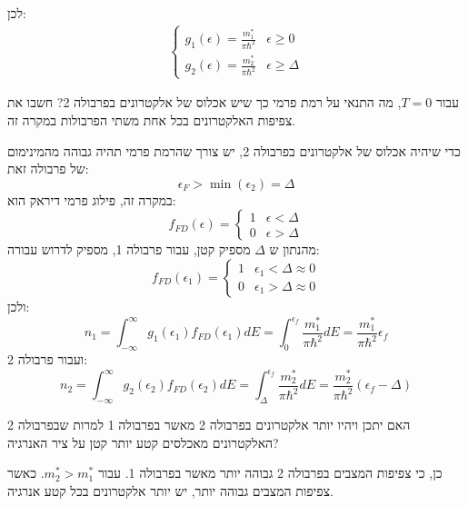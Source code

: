 \documentclass{article}
\begin{document}
\begin{Question}
\begin{SubAnswer}
    לכן:
    \begin{align*}
        \begin{cases}
            g_{1}\left( \epsilon \right)=\frac{m_{1}^{*}}{\pi \hbar^{2}}& \epsilon\geq0 \\
            g_{2}\left( \epsilon \right)=\frac{m_{2}^{*}}{\pi \hbar^{2}}     & \epsilon\geq\Delta 
        \end{cases}
    \end{align*}
\end{SubAnswer}
\begin{SubQuestion}
עבור $T=0$, מה התנאי על רמת פרמי כך שיש אכלוס של אלקטרונים בפרבולה 2? חשבו את צפיפות האלקטרונים בכל אחת משתי הפרבולות במקרה זה.
\end{SubQuestion}
\begin{SubAnswer}
כדי שיהיה אכלוס של אלקטרונים בפרבולה 2, יש צורך שהרמת פרמי תהיה גבוהה מהמינימום של פרבולה זאת:
$$\epsilon_{F}>\min{\left( \epsilon_{2} \right)}=\Delta$$
במקרה זה, פילוג פרמי דיראק הוא:
$$f_{FD}\left( \epsilon \right)=\begin{cases}
    1 & \epsilon<\Delta\\
    0 & \epsilon>\Delta
\end{cases}$$
מהנתון ש $\Delta$ מספיק קטן, עבור פרבולה 1, מספיק לדרוש עבורה:
$$f_{FD}\left( \epsilon_{1} \right)=\begin{cases}
    1 & \epsilon_{1}<\Delta\approx0\\
    0 & \epsilon_{1}>\Delta\approx0
\end{cases}$$
ולכן:
$$n_{1}=\int_{-\infty}^{\infty}g_{1}\left( \epsilon_{1} \right)f_{FD}\left( \epsilon_{1} \right)dE=\int_{0}^{\epsilon_{f}}\frac{m_{1}^{*}}{\pi \hbar^{2}}dE=\frac{m_{1}^{*}}{\pi \hbar^{2}}\epsilon_{f}
$$
ועבור פרבולה 2:
$$n_{2}=\int_{-\infty}^{\infty}g_{2}\left( \epsilon_{2} \right)f_{FD}\left( \epsilon_{2} \right)dE=\int_{\Delta}^{\epsilon_{f}}\frac{m_{2}^{*}}{\pi \hbar^{2}}dE=\frac{m_{2}^{*}}{\pi \hbar^{2}}\left( \epsilon_{f}-\Delta \right)
$$
\end{SubAnswer}
\begin{SubQuestion} 
האם יתכן ויהיו יותר אלקטרונים בפרבולה 2 מאשר בפרבולה 1 למרות שבפרבולה 2 האלקטרונים מאכלסים קטע יותר קטן על ציר האנרגיה?
\end{SubQuestion}
\begin{SubAnswer}   
כן, כי צפיפות המצבים בפרבולה 2 גבוהה יותר מאשר בפרבולה 1. עבור $m_{2}^{*}>m_{1}^{*}$. כאשר צפיפות המצבים גבוהה יותר, יש יותר אלקטרונים בכל קטע אנרגיה.
\end{SubAnswer} 
\end{Question}
\end{document}

